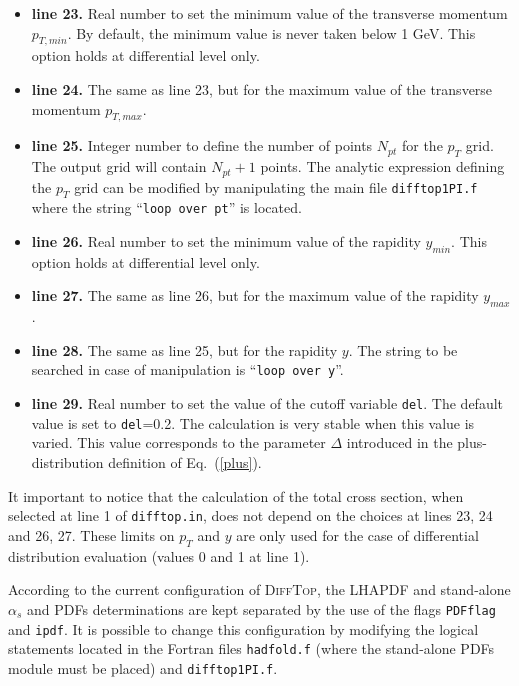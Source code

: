 \documentclass[11pt]{article}
\begin{document}
{\begin{itemize}
\item {\bf line 23.} Real number to set the minimum value of the transverse momentum $p_{T,min}$. 
By default, the minimum value is never taken below 1 GeV. This option holds at differential level only.

\item {\bf line 24.} The same as line 23, but for the maximum value of the transverse momentum $p_{T,max}$.
 
\item {\bf line 25.} Integer number to define the number of points $N_{pt}$ for the $p_T$ grid. 
The output grid will contain $N_{pt}+1$ points. The analytic expression defining the $p_T$ grid 
can be modified by manipulating the main file \texttt{difftop1PI.f} where the string ``\texttt{loop over pt}'' is located.  

\item {\bf line 26.} Real number to set the minimum value of the rapidity $y_{min}$. This option holds at differential level only.

\item {\bf line 27.} The same as line 26, but for the maximum value of the rapidity $y_{max}$. 

\item {\bf line 28.} The same as line 25, but for the rapidity $y$. The string to be searched 
in case of manipulation is ``\texttt{loop over y}''.  

\item {\bf line 29.} Real number to set the value of the cutoff variable \texttt{del}. The default value is set to \texttt{del}=0.2.
The calculation is very stable when this value is varied. This value corresponds to the parameter $\Delta$ introduced 
in the plus-distribution definition of Eq.~(\ref{plus}).
\end{itemize}



It important to notice that the calculation of the total cross section, 
when selected at line 1 of \texttt{difftop.in}, 
does not depend on the choices at lines 23, 24 and 26, 27.
These limits on $p_T$ and $y$ are only used for the case 
of differential distribution evaluation (values 0 and 1 at line 1).

According to the current configuration of \textsc{DiffTop}, the LHAPDF and stand-alone $\alpha_s$ and PDFs determinations are kept 
separated by the use of the flags \texttt{PDFflag} and \texttt{ipdf}. It is possible to change this configuration 
by modifying the logical statements located in the Fortran files \texttt{hadfold.f} (where the stand-alone PDFs module 
must be placed) and \texttt{difftop1PI.f}.

}
\end{document}
